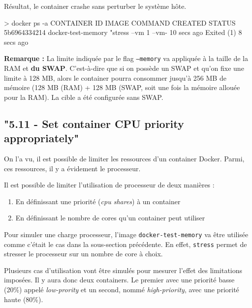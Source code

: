 \documentclass[11pt,a4paper,oneside]{report}
\newcommand{\code}[1]{\texttt{#1}}
\begin{document}
Résultat, le container crashe sans perturber le système hôte.
\begin{textcode}
> docker ps -a
CONTAINER ID  IMAGE               COMMAND               CREATED      STATUS
5b6964334214  docker-test-memory  "stress --vm 1 --vm-  10 secs ago  Exited (1) 8 secs ago
\end{textcode}

\textbf{Remarque :} La limite indiquée par le flag \code{--memory} va appliquée à la taille de la RAM et \textbf{du SWAP}\cite{marek_goldmann_res_mgmt}. C'est-à-dire que si on possède un SWAP et qu'on fixe une limite à 128 MB, alors le container pourra consommer jusqu'à 256 MB de mémoire (128 MB (RAM) + 128 MB (SWAP, soit une fois la mémoire allouée pour la RAM). La cible a été configurée sans SWAP.


\subsection{"5.11 - Set container CPU priority appropriately"}
On l'a vu, il est possible de limiter les ressources d'un container Docker. Parmi, ces ressources, il y a évidement le processeur.

Il est possible de limiter l'utilisation de processeur de deux manières :
\begin{enumerate}
\item En définissant une priorité (\textit{cpu shares}) à un container
\item En définissant le nombre de cores qu'un container peut utiliser
\end{enumerate}

Pour simuler une charge processeur, l'image \code{docker-test-memory} va être utilisée comme c'était le cas dans la sous-section précédente. En effet, \code{stress} permet de stresser le processeur sur un nombre de core à choix.

Plusieurs cas d'utilisation vont être simulés pour mesurer l'effet des limitations imposées. Il y aura donc deux containers. Le premier avec une priorité basse (20\%) appelé \textit{low-prority} et un second, nommé \textit{high-priority}, avec une priorité haute (80\%).
\end{document}
